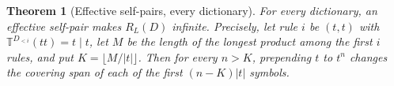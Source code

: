 \documentclass[11pt,a4paper]{article}
\theoremstyle{definition}
\theoremstyle{plain}
\newtheorem{theorem}{Theorem}
\newcommand{\T}{\mathbb{T}}
\newcommand{\ripple}{R_{L}}
\begin{document}

\begin{theorem}[Effective self-pairs, every dictionary]\label{thm:selfgeneral}
For every dictionary, an effective self-pair makes \(\ripple(D)\) infinite. Precisely, let rule \(i\) be \((t, t)\) with
\(\T^{D_{<i}}(tt) = t \mid t\), let \(M\) be the length of the longest product among the first \(i\) rules, and put
\(K = \lfloor M/|t| \rfloor\). Then for every \(n > K\), prepending \(t\) to \(t^n\) changes the covering span of each
of the first \((n - K)|t|\) symbols.
\end{theorem}
\end{document}
